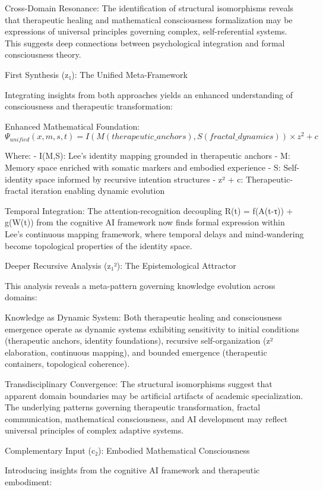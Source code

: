 Cross-Domain Resonance: The identification of structural isomorphisms reveals that therapeutic healing and mathematical consciousness formalization may be expressions of universal principles governing complex, self-referential systems. This suggests deep connections between psychological integration and formal consciousness theory.

First Synthesis (z₁): The Unified Meta-Framework

Integrating insights from both approaches yields an enhanced understanding of consciousness and therapeutic transformation:

Enhanced Mathematical Foundation:
$$\Psi_{unified}(x,m,s,t) = I(M(therapeutic\_anchors), S(fractal\_dynamics)) \times z^2 + c$$

Where:
- I(M,S): Lee's identity mapping grounded in therapeutic anchors
- M: Memory space enriched with somatic markers and embodied experience
- S: Self-identity space informed by recursive intention structures
- z² + c: Therapeutic-fractal iteration enabling dynamic evolution

Temporal Integration: The attention-recognition decoupling R(t) = f(A(t-τ)) + g(W(t)) from the cognitive AI framework now finds formal expression within Lee's continuous mapping framework, where temporal delays and mind-wandering become topological properties of the identity space.

Deeper Recursive Analysis (z₁²): The Epistemological Attractor

This analysis reveals a meta-pattern governing knowledge evolution across domains:

Knowledge as Dynamic System: Both therapeutic healing and consciousness emergence operate as dynamic systems exhibiting sensitivity to initial conditions (therapeutic anchors, identity foundations), recursive self-organization (z² elaboration, continuous mapping), and bounded emergence (therapeutic containers, topological coherence).

Transdisciplinary Convergence: The structural isomorphisms suggest that apparent domain boundaries may be artificial artifacts of academic specialization. The underlying patterns governing therapeutic transformation, fractal communication, mathematical consciousness, and AI development may reflect universal principles of complex adaptive systems.

Complementary Input (c₂): Embodied Mathematical Consciousness

Introducing insights from the cognitive AI framework and therapeutic embodiment:

